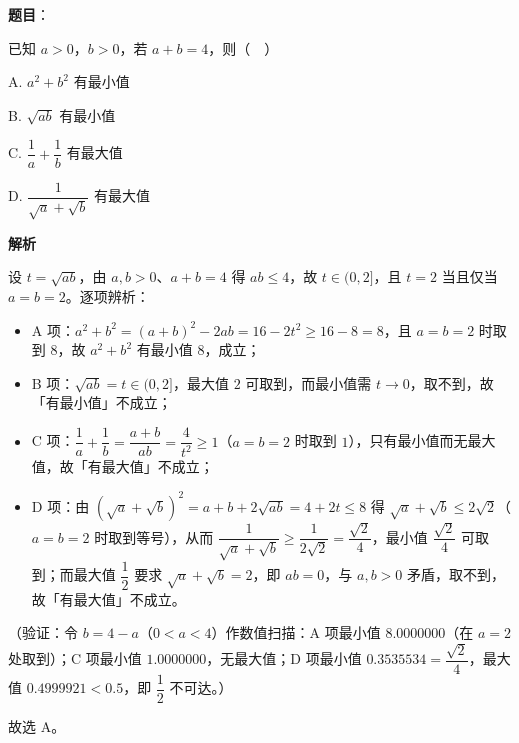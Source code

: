 \begin{answer}

\textbf{题目}：

已知 \(a>0\)，\(b>0\)，若 \(a+b=4\)，则（　）

A. \(a^{2}+b^{2}\) 有最小值

B. \(\sqrt{ab}\) 有最小值

C. \(\dfrac{1}{a}+\dfrac{1}{b}\) 有最大值

D. \(\dfrac{1}{\sqrt{a}+\sqrt{b}}\) 有最大值

\textbf{解析}

设 \(t=\sqrt{ab}\)，由 \(a,b>0\)、\(a+b=4\) 得 \(ab\leqslant4\)，故 \(t\in(0,2]\)，且 \(t=2\) 当且仅当 \(a=b=2\)。逐项辨析：

\begin{itemize}
\item A 项：\(a^{2}+b^{2}=(a+b)^{2}-2ab=16-2t^{2}\geqslant16-8=8\)，且 \(a=b=2\) 时取到 \(8\)，故 \(a^{2}+b^{2}\) 有最小值 \(8\)，成立；
\item B 项：\(\sqrt{ab}=t\in(0,2]\)，最大值 \(2\) 可取到，而最小值需 \(t\to0\)，取不到，故「有最小值」不成立；
\item C 项：\(\dfrac{1}{a}+\dfrac{1}{b}=\dfrac{a+b}{ab}=\dfrac{4}{t^{2}}\geqslant1\)（\(a=b=2\) 时取到 \(1\)），只有最小值而无最大值，故「有最大值」不成立；
\item D 项：由 \((\sqrt{a}+\sqrt{b})^{2}=a+b+2\sqrt{ab}=4+2t\leqslant8\) 得 \(\sqrt{a}+\sqrt{b}\leqslant2\sqrt{2}\)（\(a=b=2\) 时取到等号），从而 \(\dfrac{1}{\sqrt{a}+\sqrt{b}}\geqslant\dfrac{1}{2\sqrt{2}}=\dfrac{\sqrt{2}}{4}\)，最小值 \(\dfrac{\sqrt{2}}{4}\) 可取到；而最大值 \(\dfrac{1}{2}\) 要求 \(\sqrt{a}+\sqrt{b}=2\)，即 \(ab=0\)，与 \(a,b>0\) 矛盾，取不到，故「有最大值」不成立。
\end{itemize}

（验证：令 \(b=4-a\)（\(0<a<4\)）作数值扫描：A 项最小值 \(8.0000000\)（在 \(a=2\) 处取到）；C 项最小值 \(1.0000000\)，无最大值；D 项最小值 \(0.3535534=\dfrac{\sqrt{2}}{4}\)，最大值 \(0.4999921<0.5\)，即 \(\dfrac{1}{2}\) 不可达。）

故选 A。


\end{answer}
